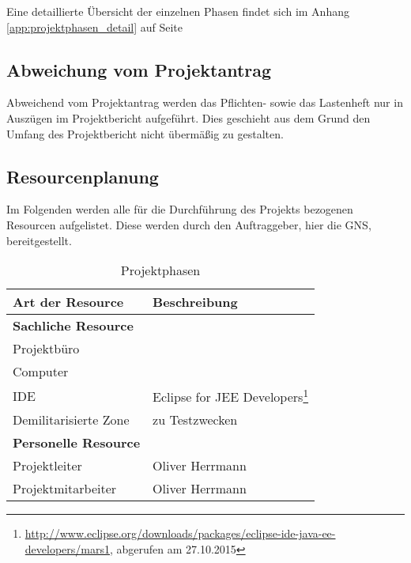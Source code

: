 \documentclass[12pt, xcolor=dvipsnames]{scrartcl}
\begin{document}
	Eine detaillierte Übersicht der einzelnen Phasen findet sich im Anhang \ref{app:projektphasen_detail} auf Seite \pageref{app:projektphasen_detail}
	

\subsection{Abweichung vom Projektantrag}

Abweichend vom Projektantrag werden das Pflichten- sowie das Lastenheft nur in Auszügen im Projektbericht aufgeführt. Dies geschieht aus dem Grund den Umfang des Projektbericht nicht übermäßig zu gestalten.

\subsection{Resourcenplanung}

Im Folgenden werden alle für die Durchführung des Projekts bezogenen Resourcen aufgelistet. Diese werden durch den Auftraggeber, hier die GNS, bereitgestellt.

\begin{savenotes}
\begin{table}[H]
	\centering
	\begin{tabular}{ll}

		\rowcolor{white!15}				
		\textbf{Art der Resource} & \textbf{Beschreibung} \\\hline		
		
		\rowcolor{MidnightBlue!15}				
		\textbf{Sachliche Resource} & \\
		Projektbüro & \\
		Computer & \\
		\hspace{1.5em} IDE & Eclipse for JEE Developers\footnote{\url{http://www.eclipse.org/downloads/packages/eclipse-ide-java-ee-developers/mars1}, abgerufen am 27.10.2015} \\
		Demilitarisierte Zone & zu Testzwecken \\
		
		\rowcolor{MidnightBlue!15}			
		\textbf{Personelle Resource} & \\
		Projektleiter & Oliver Herrmann \\
		Projektmitarbeiter & Oliver Herrmann \\
	
			    
	\end{tabular}
	\caption{Projektphasen}
	\label{tab:projektphasen}
\end{table}
\end{savenotes}
\end{document}

